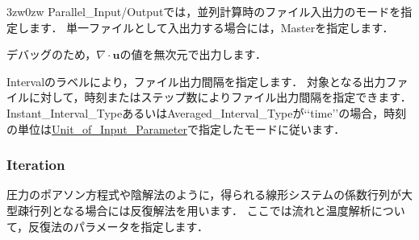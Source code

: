 \begin{indentation}{3zw}{0zw}
Parallel\_Input/Outputでは，並列計算時のファイル入出力のモードを指定します．
単一ファイルとして入出力する場合には，Masterを指定します．

デバッグのため，$\nabla \cdot \bm{u}$の値を無次元で出力します．

Intervalのラベルにより，ファイル出力間隔を指定します．
対象となる出力ファイルに対して，時刻またはステップ数によりファイル出力間隔を指定できます．
Instant\_Interval\_TypeあるいはAveraged\_Interval\_Typeが\lq\lq time\rq\rq の場合，時刻の単位は\hyperlink{tgt:unit}{Unit\_of\_Input\_Parameter}で指定したモードに従います．
\end{indentation}





\pagebreak
\subsubsection{Iteration}

圧力のポアソン方程式や陰解法のように，得られる線形システムの係数行列が大型疎行列となる場合には反復解法を用います．
ここでは流れと温度解析について，\hypertarget{tgt:iteration}{反復法のパラメータを指定}します．

